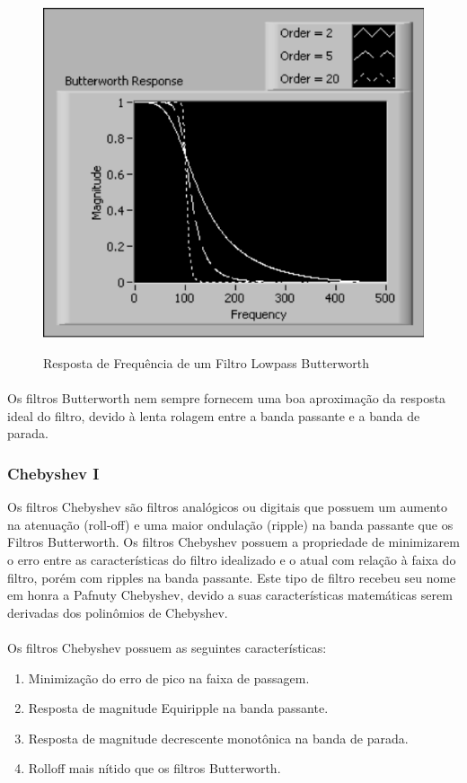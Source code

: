 \documentclass[12pt,fleqn]{article}
\begin{document}
\begin{figure}[!htb]
    \centering
    \includegraphics[scale=0.6]{fig/figura5.png}
    \label{figura:figura1}
    \caption{Resposta de Frequência de um Filtro Lowpass Butterworth}
\end{figure}

\paragraph{} Os filtros Butterworth nem sempre fornecem uma boa aproximação da resposta ideal do filtro, devido à lenta rolagem entre a banda passante e a banda de parada.

\subsubsection{Chebyshev I}
Os filtros Chebyshev são filtros analógicos ou digitais que possuem um aumento na atenuação (roll-off) e uma maior ondulação (ripple) na banda passante que os Filtros Butterworth. Os filtros Chebyshev possuem a propriedade de minimizarem o erro entre as características do filtro idealizado e o atual com relação à faixa do filtro, porém com ripples na banda passante. Este tipo de filtro recebeu seu nome em honra a Pafnuty Chebyshev, devido a suas características matemáticas serem derivadas dos polinômios de Chebyshev.

\paragraph{} Os filtros Chebyshev possuem as seguintes características:
\begin{enumerate}
    \item Minimização do erro de pico na faixa de passagem.
    \item Resposta de magnitude Equiripple na banda passante.
    \item Resposta de magnitude decrescente monotônica na banda de parada.
    \item Rolloff mais nítido que os filtros Butterworth.
\end{enumerate}{}
\end{document}
